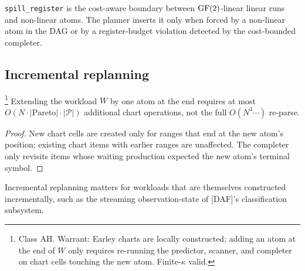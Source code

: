 \texttt{spill\_register} is the cost-aware boundary
between $\operatorname{GF}(2)$-linear linear runs and non-linear
atoms. The planner inserts it only when forced by a
non-linear atom in the DAG or by a register-budget
violation detected by the cost-bounded completer.

\subsection{Incremental replanning}

\begin{proposition}
  \label{prop:incremental}
  \footnote{Class \textsf{AH}. Warrant: Earley charts
  are locally constructed; adding an atom at the
  end of $W$ only requires re-running the predictor,
  scanner, and completer on chart cells touching the
  new atom. Finite-$\kappa$ valid.}
  Extending the workload $W$ by one atom at the end
  requires at most $O(N \cdot |\mathrm{Pareto}|
  \cdot |\mathcal{P}|)$ additional chart operations,
  not the full $O(N^3 \cdots)$ re-parse.
\end{proposition}

\begin{proof}
  New chart cells are created only for ranges that
  end at the new atom's position; existing chart
  items with earlier ranges are unaffected. The
  completer only revisits items whose waiting
  production expected the new atom's terminal
  symbol.
\end{proof}

Incremental replanning matters for workloads that
are themselves constructed incrementally, such as
the streaming observation-state of [DAF]'s
classification subsystem.
